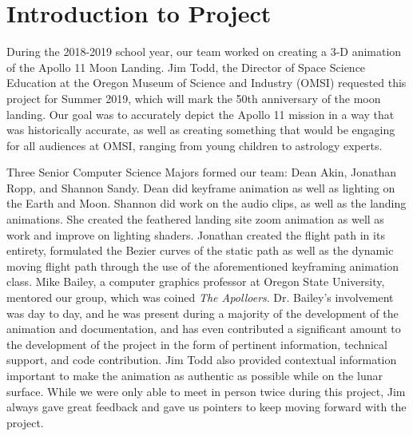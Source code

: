 \documentclass[onecolumn, draftclsnofoot,10pt, compsoc]{IEEEtran}
\begin{document}
\section{Introduction to Project}

During the 2018-2019 school year, our team worked on creating a 3-D animation of the  Apollo 11 Moon Landing. Jim Todd, the Director of Space Science Education at the Oregon Museum of Science and Industry (OMSI) requested this project for Summer 2019, which will mark the 50th anniversary of the moon landing. Our goal was to accurately depict the Apollo 11 mission in a way that was historically accurate, as well as creating something that would be engaging for all audiences at OMSI, ranging from young children to astrology experts. 

Three Senior Computer Science Majors formed our team: Dean Akin, Jonathan Ropp, and Shannon Sandy. Dean did keyframe animation as well as lighting on the Earth and Moon. Shannon did work on the audio clips, as well as the landing animations. She created the feathered landing site zoom animation as well as work and improve on lighting shaders. Jonathan created the flight path in its entirety, formulated the Bezier curves of the static path as well as the dynamic moving flight path through the use of the aforementioned keyframing animation class. Mike Bailey, a computer graphics professor at Oregon State University, mentored our group, which was coined \textit{The Apolloers}. Dr. Bailey's involvement was day to day, and he was present during a majority of the development of the animation and documentation, and has even contributed a significant amount to the development of the project in the form of pertinent information, technical support, and code contribution. Jim Todd also provided contextual information important to make the animation as authentic as possible while on the lunar surface. While we were only able to meet in person twice during this project, Jim always gave great feedback and gave us pointers to keep moving forward with the project. 
\end{document}

